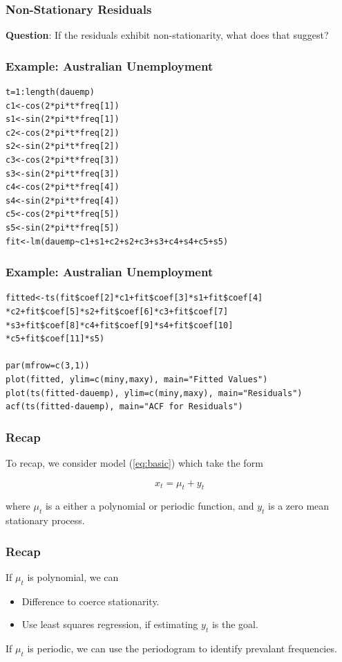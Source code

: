 \documentclass[%
xcolor=pdftex]{beamer}
\begin{document}
\begin{frame}[fragile]
\frametitle{Non-Stationary Residuals}

\textbf{Question}: If the residuals exhibit non-stationarity, what does that suggest?

\end{frame}

\begin{frame}[fragile]
\frametitle{Example: Australian Unemployment}

\begin{verbatim}
t=1:length(dauemp)
c1<-cos(2*pi*t*freq[1])
s1<-sin(2*pi*t*freq[1])
c2<-cos(2*pi*t*freq[2])
s2<-sin(2*pi*t*freq[2])
c3<-cos(2*pi*t*freq[3])
s3<-sin(2*pi*t*freq[3])
c4<-cos(2*pi*t*freq[4])
s4<-sin(2*pi*t*freq[4])
c5<-cos(2*pi*t*freq[5])
s5<-sin(2*pi*t*freq[5])
fit<-lm(dauemp~c1+s1+c2+s2+c3+s3+c4+s4+c5+s5)
\end{verbatim}

\end{frame}

\begin{frame}[fragile]
\frametitle{Example: Australian Unemployment}

\begin{verbatim}
fitted<-ts(fit$coef[2]*c1+fit$coef[3]*s1+fit$coef[4]
*c2+fit$coef[5]*s2+fit$coef[6]*c3+fit$coef[7]
*s3+fit$coef[8]*c4+fit$coef[9]*s4+fit$coef[10]
*c5+fit$coef[11]*s5)

par(mfrow=c(3,1))
plot(fitted, ylim=c(miny,maxy), main="Fitted Values")
plot(ts(fitted-dauemp), ylim=c(miny,maxy), main="Residuals")
acf(ts(fitted-dauemp), main="ACF for Residuals")
\end{verbatim}

\end{frame}




\begin{frame}
\frametitle{Recap}

To recap, we consider model (\ref{eq:basic}) which take the form

$$
x_t=\mu_t+y_t
$$

where $\mu_t$ is a either a polynomial or periodic function, and $y_t$ is a zero mean stationary process.

\end{frame}

\begin{frame}
\frametitle{Recap}

If $\mu_t$ is polynomial, we can

\begin{itemize}
\item Difference to coerce stationarity.
\item Use least squares regression, if estimating $y_t$ is the goal.
\end{itemize}

If $\mu_t$ is periodic, we can use the periodogram to identify prevalant frequencies.

\end{frame}
\end{document}
